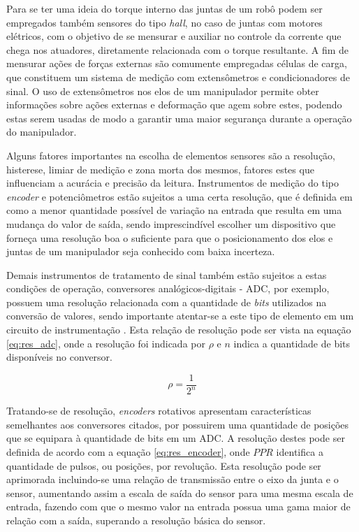Para se ter uma ideia do torque interno das juntas de um robô podem ser empregados também sensores do tipo \textit{hall}, no caso de juntas com motores elétricos, 
com o objetivo de se mensurar e auxiliar no controle da corrente que chega nos atuadores, diretamente relacionada com o torque resultante. A fim de mensurar ações de forças 
externas são comumente empregadas células de carga, que constituem um sistema de medição com extensômetros e condicionadores de sinal. O uso de extensômetros nos 
elos de um manipulador permite obter informações sobre ações externas e deformação que agem sobre estes, podendo estas serem usadas de modo a garantir uma maior
segurança durante a operação do manipulador.

Alguns fatores importantes na escolha de elementos sensores são a 
resolução, histerese, limiar de medição e zona morta dos mesmos, 
fatores estes que influenciam a acurácia e precisão da leitura. 
Instrumentos de medição do tipo \textit{encoder} e potenciômetros 
estão sujeitos a uma certa resolução, que é definida em \cite{doebelin2007measurement} 
como a menor quantidade possível de variação na entrada que resulta 
em uma mudança do valor de saída, sendo imprescindível escolher um 
dispositivo que forneça uma resolução boa o suficiente para que o 
posicionamento dos elos e juntas de um manipulador seja conhecido 
com baixa incerteza.

Demais instrumentos de tratamento de sinal também estão sujeitos a estas
condições de operação, conversores analógicos-digitais - ADC, por exemplo, possuem
uma resolução relacionada com a quantidade de \textit{bits} utilizados
na conversão de valores, sendo importante atentar-se a este tipo de 
elemento em um circuito de instrumentação \cite{bentley2005principles}. 
Esta relação de resolução pode ser vista na equação \ref{eq:res_adc}, 
onde a resolução foi indicada
por $\rho$ e $n$ indica a quantidade de bits disponíveis no conversor.

\begin{equation}
    \label{eq:res_adc}
    \rho = \frac{1}{2^n}
\end{equation}

Tratando-se de resolução, \textit{encoders} rotativos apresentam características
semelhantes aos conversores citados, por possuirem uma quantidade de posições  
que se equipara à quantidade de bits em um ADC. 
A resolução destes pode ser definida de acordo com
a equação \ref{eq:res_encoder}, onde $PPR$ identifica a quantidade de 
pulsos, ou posições, por revolução. Esta resolução pode ser aprimorada
incluindo-se uma relação de transmissão entre o eixo da junta e o sensor,
aumentando assim a escala de saída do sensor para uma mesma escala
de entrada, fazendo com que o mesmo valor na entrada possua uma gama maior
de relação com a saída, superando a resolução básica do sensor.

